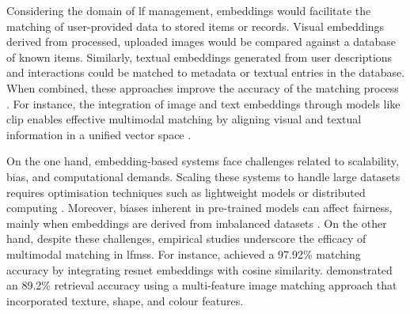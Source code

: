 Considering the domain of \ac{lf} management, embeddings would facilitate the matching of user-provided data to stored items or records. Visual embeddings derived from processed, uploaded images would be compared against a database of known items. Similarly, textual embeddings generated from user descriptions and interactions could be matched to metadata or textual entries in the database. When combined, these approaches improve the accuracy of the matching process \cite{Prawira2024, Radford2021}. For instance, the integration of image and text embeddings through models like \ac{clip} enables effective multimodal matching by aligning visual and textual information in a unified vector space \cite{Radford2021}.

On the one hand, embedding-based systems face challenges related to scalability, bias, and computational demands. Scaling these systems to handle large datasets requires optimisation techniques such as lightweight models or distributed computing \cite{Lubna2021}. Moreover, biases inherent in pre-trained models can affect fairness, mainly when embeddings are derived from imbalanced datasets \cite{Prawira2024}. On the other hand, despite these challenges, empirical studies underscore the efficacy of multimodal matching in \acp{lfms}. For instance,  achieved a 97.92\% matching accuracy by integrating \ac{resnet} embeddings with cosine similarity.  demonstrated an 89.2\% retrieval accuracy using a multi-feature image matching approach that incorporated texture, shape, and colour features.